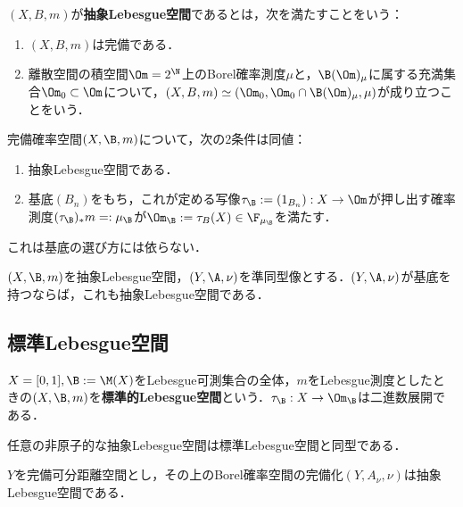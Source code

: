 \documentclass[uplatex,dvipdfmx]{jsreport}
\begin{document}
\begin{definition}
    $(X,B,m)$が\textbf{抽象Lebesgue空間}であるとは，次を満たすことをいう：
    \begin{enumerate}
        \item $(X,B,m)$は完備である．
        \item 離散空間の積空間$\Om=2^\N$上のBorel確率測度$\mu$と，$\B(\Om)_\mu$に属する充満集合$\Om_0\subset\Om$について，$(X,B,m)\simeq(\Om_0,\Om_0\cap\B(\Om)_\mu,\mu)$が成り立つことをいう．
    \end{enumerate}
\end{definition}

\begin{proposition}
    完備確率空間$(X,\B,m)$について，次の2条件は同値：
    \begin{enumerate}
        \item 抽象Lebesgue空間である．
        \item 基底$(B_n)$をもち，これが定める写像$\tau_\B:=(1_{B_n}):X\to\Om$が押し出す確率測度$(\tau_\B)_*m=:\mu_\B$が$\Om_\B:=\tau_B(X)\in\F_{\mu_\B}$を満たす．
    \end{enumerate}
    これは基底の選び方には依らない．
\end{proposition}

\begin{proposition}
    $(X,\B,m)$を抽象Lebesgue空間，$(Y,\A,\nu)$を準同型像とする．$(Y,\A,\nu)$が基底を持つならば，これも抽象Lebesgue空間である．
\end{proposition}

\subsection{標準Lebesgue空間}

\begin{definition}
    $X=[0,1],\B:=\M(X)$をLebesgue可測集合の全体，$m$をLebesgue測度としたときの$(X,\B,m)$を\textbf{標準的Lebesgue空間}という．$\tau_\B:X\to\Om_\B$は二進数展開である．
\end{definition}

\begin{proposition}
    任意の非原子的な抽象Lebesgue空間は標準Lebesgue空間と同型である．
\end{proposition}

\begin{proposition}
    $Y$を完備可分距離空間とし，その上のBorel確率空間の完備化$(Y,A_\nu,\nu)$は抽象Lebesgue空間である．
\end{proposition}
\end{document}
